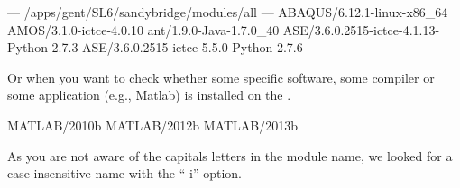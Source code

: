 \begin{prompt}
--- /apps/gent/SL6/sandybridge/modules/all ---
ABAQUS/6.12.1-linux-x86_64
AMOS/3.1.0-ictce-4.0.10
ant/1.9.0-Java-1.7.0_40
ASE/3.6.0.2515-ictce-4.1.13-Python-2.7.3
ASE/3.6.0.2515-ictce-5.5.0-Python-2.7.6
\end{prompt}

Or when you want to check whether some specific software, some compiler or some
application (e.g., Matlab) is installed on the \hpc.

\begin{prompt}
MATLAB/2010b
MATLAB/2012b
MATLAB/2013b
\end{prompt}

As you are not aware of the capitals letters in the module name, we looked for
a case-insensitive name with the ``-i'' option.
